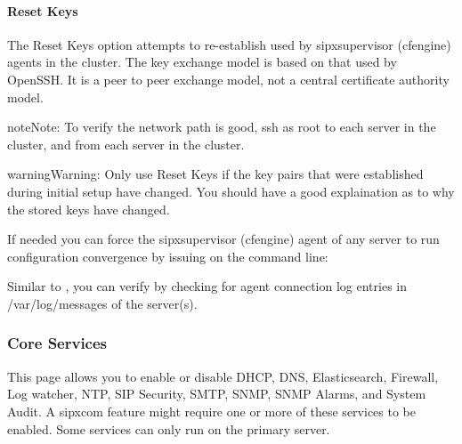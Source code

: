 \documentclass[letterpaper,10pt,english]{sphinxmanual}
\begin{document}
\paragraph{Reset Keys}
\label{\detokenize{webui:reset-keys}}
The Reset Keys option attempts to re-establish  used by sipxsupervisor (cfengine) agents in the cluster.
The key exchange model is based on that used by OpenSSH. It is a peer to peer exchange model, not a central certificate authority model.

\begin{sphinxadmonition}{note}{Note:}
To verify the network path is good, ssh as root to each server in the cluster, and from each server in the cluster.
\end{sphinxadmonition}

\begin{sphinxadmonition}{warning}{Warning:}
Only use Reset Keys if the key pairs that were established during initial setup have changed. You should have a good explaination as to why the stored keys have changed.
\end{sphinxadmonition}

If needed you can force the sipxsupervisor (cfengine) agent of any server to run configuration convergence by issuing on the command line:

\begin{sphinxVerbatim}[commandchars=\\\{\}]
\end{sphinxVerbatim}

Similar to {\hyperref[\detokenize{webui:sending-server-profiles}]{}}, you can verify by checking for agent connection log entries in /var/log/messages of the server(s).


\subsubsection{Core Services}
\label{\detokenize{webui:core-services}}\label{\detokenize{webui:id28}}
This page allows you to enable or disable DHCP, DNS, Elasticsearch, Firewall, Log watcher, NTP, SIP Security, SMTP, SNMP, SNMP Alarms, and System Audit. A sipxcom feature might require one or more of these services to be enabled. Some services can only run on the primary server.
\begin{quote}

\end{quote}
\end{document}
